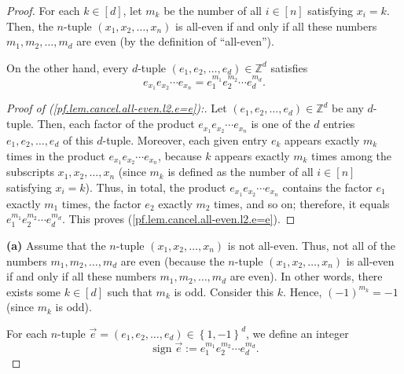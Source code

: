 \begin{proof}
For each $k\in\left[  d\right]  $, let $m_{k}$ be the number of all
$i\in\left[  n\right]  $ satisfying $x_{i}=k$. Then, the $n$-tuple $\left(
x_{1},x_{2},\ldots,x_{n}\right)  $ is all-even if and only if all these
numbers $m_{1},m_{2},\ldots,m_{d}$ are even (by the definition of
\textquotedblleft all-even\textquotedblright).

On the other hand, every $d$-tuple $\left(  e_{1},e_{2},\ldots,e_{d}\right)
\in\mathbb{Z}^{d}$ satisfies%
\begin{equation}
e_{x_{1}}e_{x_{2}}\cdots e_{x_{n}}=e_{1}^{m_{1}}e_{2}^{m_{2}}\cdots
e_{d}^{m_{d}}. \label{pf.lem.cancel.all-even.l2.e=e}%
\end{equation}


\begin{proof}
[Proof of (\ref{pf.lem.cancel.all-even.l2.e=e}):]Let $\left(  e_{1}%
,e_{2},\ldots,e_{d}\right)  \in\mathbb{Z}^{d}$ be any $d$-tuple. Then, each
factor of the product $e_{x_{1}}e_{x_{2}}\cdots e_{x_{n}}$ is one of the $d$
entries $e_{1},e_{2},\ldots,e_{d}$ of this $d$-tuple. Moreover, each given
entry $e_{k}$ appears exactly $m_{k}$ times in the product $e_{x_{1}}e_{x_{2}%
}\cdots e_{x_{n}}$, because $k$ appears exactly $m_{k}$ times among the
subscripts $x_{1},x_{2},\ldots,x_{n}$ (since $m_{k}$ is defined as the number
of all $i\in\left[  n\right]  $ satisfying $x_{i}=k$). Thus, in total, the
product $e_{x_{1}}e_{x_{2}}\cdots e_{x_{n}}$ contains the factor $e_{1}$
exactly $m_{1}$ times, the factor $e_{2}$ exactly $m_{2}$ times, and so on;
therefore, it equals $e_{1}^{m_{1}}e_{2}^{m_{2}}\cdots e_{d}^{m_{d}}$. This
proves (\ref{pf.lem.cancel.all-even.l2.e=e}).
\end{proof}

\textbf{(a)} Assume that the $n$-tuple $\left(  x_{1},x_{2},\ldots
,x_{n}\right)  $ is not all-even. Thus, not all of the numbers $m_{1}%
,m_{2},\ldots,m_{d}$ are even (because the $n$-tuple $\left(  x_{1}%
,x_{2},\ldots,x_{n}\right)  $ is all-even if and only if all these numbers
$m_{1},m_{2},\ldots,m_{d}$ are even). In other words, there exists some
$k\in\left[  d\right]  $ such that $m_{k}$ is odd. Consider this $k$. Hence,
$\left(  -1\right)  ^{m_{k}}=-1$ (since $m_{k}$ is odd).

For each $n$-tuple $\overrightarrow{e}=\left(  e_{1},e_{2},\ldots
,e_{d}\right)  \in\left\{  1,-1\right\}  ^{d}$, we define an integer
\[
\operatorname*{sign}\overrightarrow{e}:=e_{1}^{m_{1}}e_{2}^{m_{2}}\cdots
e_{d}^{m_{d}}.
\]



\end{proof}
